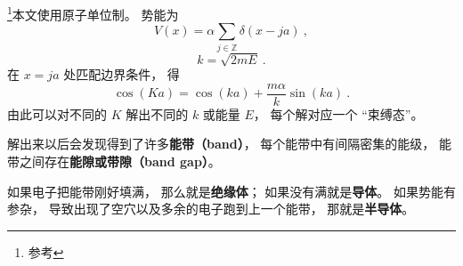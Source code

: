 
\begin{issues}
\issueDraft
\end{issues}


\footnote{参考\cite{GriffQ}}本文使用原子单位制。 势能为
\begin{equation}
V(x) = \alpha \sum_{j\in \mathbb Z} \delta(x - ja)~,
\end{equation}
\begin{equation}
k = \sqrt{2mE}~.
\end{equation}
在 $x = ja$ 处匹配边界条件， 得
\begin{equation}
\cos(K a) = \cos(ka) + \frac{m\alpha}{k}\sin(ka)~.
\end{equation}
由此可以对不同的 $K$ 解出不同的 $k$ 或能量 $E$， 每个解对应一个 “束缚态”。

解出来以后会发现得到了许多\textbf{能带（band）}， 每个能带中有间隔密集的能级， 能带之间存在\textbf{能隙或带隙（band gap）}。

如果电子把能带刚好填满， 那么就是\textbf{绝缘体}； 如果没有满就是\textbf{导体}。 如果势能有参杂， 导致出现了空穴以及多余的电子跑到上一个能带， 那就是\textbf{半导体}。
